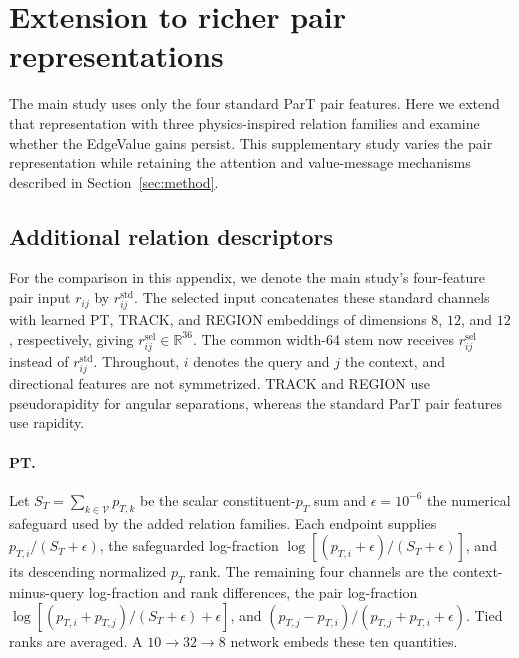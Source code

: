 \section{Extension to richer pair representations}
\label{sec:richer-relations}

The main study uses only the four standard ParT pair features. Here we
extend that representation with three physics-inspired relation families
and examine whether the EdgeValue gains persist. This supplementary study
varies the pair representation while retaining the attention and value-message
mechanisms described in Section~\ref{sec:method}.

\subsection{Additional relation descriptors}
\label{sec:selected-descriptors}

For the comparison in this appendix, we denote the main study's four-feature
pair input $r_{ij}$ by $r^{\mathrm{std}}_{ij}$.
The selected input concatenates these standard channels with learned PT,
TRACK, and REGION embeddings of dimensions $8$, $12$, and $12$, respectively,
giving $r^{\mathrm{sel}}_{ij}\in\mathbb R^{36}$. The common width-64 stem now
receives $r^{\mathrm{sel}}_{ij}$ instead of $r^{\mathrm{std}}_{ij}$.
Throughout, $i$ denotes the query and $j$ the context, and directional features
are not symmetrized. TRACK and REGION use pseudorapidity for angular
separations, whereas the standard ParT pair features use rapidity.

\paragraph{PT.}
Let $S_T=\sum_{k\in\mathcal V}p_{T,k}$ be the scalar constituent-$p_T$ sum
and $\epsilon=10^{-6}$ the numerical safeguard used by the added relation
families. Each endpoint supplies $p_{T,i}/(S_T+\epsilon)$, the safeguarded
log-fraction $\log[(p_{T,i}+\epsilon)/(S_T+\epsilon)]$, and its descending
normalized $p_T$ rank. The remaining four channels are the context-minus-query
log-fraction and rank differences, the pair log-fraction
$\log[(p_{T,i}+p_{T,j})/(S_T+\epsilon)+\epsilon]$, and
$(p_{T,j}-p_{T,i})/(p_{T,j}+p_{T,i}+\epsilon)$. Tied ranks are averaged.
A $10\!\to\!32\!\to\!8$ network embeds these ten quantities.

